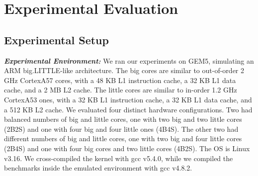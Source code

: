 \section{Experimental Evaluation}

\subsection{Experimental Setup}


\textbf{\textit{Experimental Environment:}} We ran our experiments on GEM5, simulating an ARM big.LITTLE-like architecture. The big cores are similar to out-of-order 2 GHz CortexA57 cores, with a 48 KB L1 instruction cache, a 32 KB L1 data cache, and a 2 MB L2 cache. The little cores are similar to in-order 1.2 GHz CortexA53 ones, with a 32 KB L1 instruction cache, a 32 KB L1 data cache, and a 512 KB L2 cache. We evaluated four distinct hardware configurations. Two had balanced numbers of big and little cores, one with two big and two little cores (2B2S) and one with four big and four little ones (4B4S). The other two had different numbers of big and little cores, one with two big and four little cores (2B4S) and one with four big cores and two little cores (4B2S). The OS is Linux v3.16. We cross-compiled the kernel with gcc v5.4.0, while we compiled the benchmarks inside the emulated environment with gcc v4.8.2.


